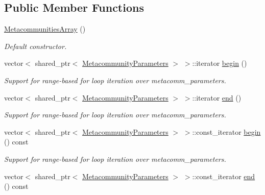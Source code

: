 \subsection*{Public Member Functions}
\begin{DoxyCompactItemize}
\item 
\hyperlink{struct_metacommunities_array_ac06b31ab097315a80514fc03ae99ed27}{Metacommunities\+Array} ()\hypertarget{struct_metacommunities_array_ac06b31ab097315a80514fc03ae99ed27}{}\label{struct_metacommunities_array_ac06b31ab097315a80514fc03ae99ed27}

\begin{DoxyCompactList}\small\item\em Default constructor. \end{DoxyCompactList}\item 
vector$<$ shared\+\_\+ptr$<$ \hyperlink{struct_metacommunity_parameters}{Metacommunity\+Parameters} $>$ $>$\+::iterator \hyperlink{struct_metacommunities_array_a73d6e0fb339af3a27bcbf428d8caf0fc}{begin} ()
\begin{DoxyCompactList}\small\item\em Support for range-\/based for loop iteration over metacomm\+\_\+parameters. \end{DoxyCompactList}\item 
vector$<$ shared\+\_\+ptr$<$ \hyperlink{struct_metacommunity_parameters}{Metacommunity\+Parameters} $>$ $>$\+::iterator \hyperlink{struct_metacommunities_array_a3a49a550c463078f51c04b5ab32e12cd}{end} ()
\begin{DoxyCompactList}\small\item\em Support for range-\/based for loop iteration over metacomm\+\_\+parameters. \end{DoxyCompactList}\item 
vector$<$ shared\+\_\+ptr$<$ \hyperlink{struct_metacommunity_parameters}{Metacommunity\+Parameters} $>$ $>$\+::const\+\_\+iterator \hyperlink{struct_metacommunities_array_aafe83642b1b45af29578b0c8a9829a99}{begin} () const 
\begin{DoxyCompactList}\small\item\em Support for range-\/based for loop iteration over metacomm\+\_\+parameters. \end{DoxyCompactList}\item 
vector$<$ shared\+\_\+ptr$<$ \hyperlink{struct_metacommunity_parameters}{Metacommunity\+Parameters} $>$ $>$\+::const\+\_\+iterator \hyperlink{struct_metacommunities_array_a29765f064310ea5bad76d2bfb56f8619}{end} () const 

\end{DoxyCompactItemize}
